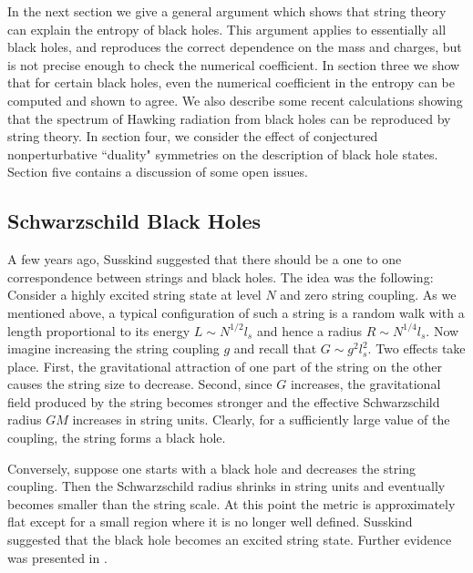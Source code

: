 In the next section we give a general argument which shows that 
string theory can explain the entropy of black holes. This argument
applies to essentially all black holes, and reproduces the correct dependence
on the mass and charges, but is not precise enough
to check the numerical coefficient. In section three we show that for
certain black holes, even the numerical coefficient in the entropy can
be computed and shown to agree. We also describe some recent calculations
showing that the spectrum of Hawking radiation from black holes can be 
reproduced by
string theory. In section four, we consider the effect of conjectured
nonperturbative ``duality" symmetries  on the description of black hole states. 
Section five contains a discussion of some open issues.



\subsection{Schwarzschild Black Holes}

A few years ago, Susskind \cite{suss1}
suggested that there should be a one to one
correspondence between strings and black holes. The idea was the following:
Consider a  highly excited string state at level $N$ and
zero string coupling. As we mentioned above, 
a typical
configuration of such a string is a random walk with a length  proportional
to its energy $L\sim N^{1/2} l_s$ and hence a radius $R\sim N^{1/4} l_s$. 
 Now imagine
increasing the string coupling $g$ and recall that $G \sim g^2 l_s^2$.
Two effects take place. First,
the gravitational attraction of one part of the string on the other
causes the string size to  decrease. 
Second, since $G$ increases, the gravitational field produced by the string
becomes stronger and the effective
Schwarzschild radius  $GM$ increases in string units. Clearly, for a 
sufficiently large  value of the
coupling, the string forms a black hole. 

Conversely, suppose  one starts with a black hole and decreases the
string coupling. Then the Schwarzschild radius
shrinks in string units and 
eventually becomes smaller than the string scale. At this point
the metric is approximately flat except for a small region where it is
no longer well defined. Susskind suggested that the 
black hole becomes an excited string state. Further evidence was presented
in \cite{hkrs}.

